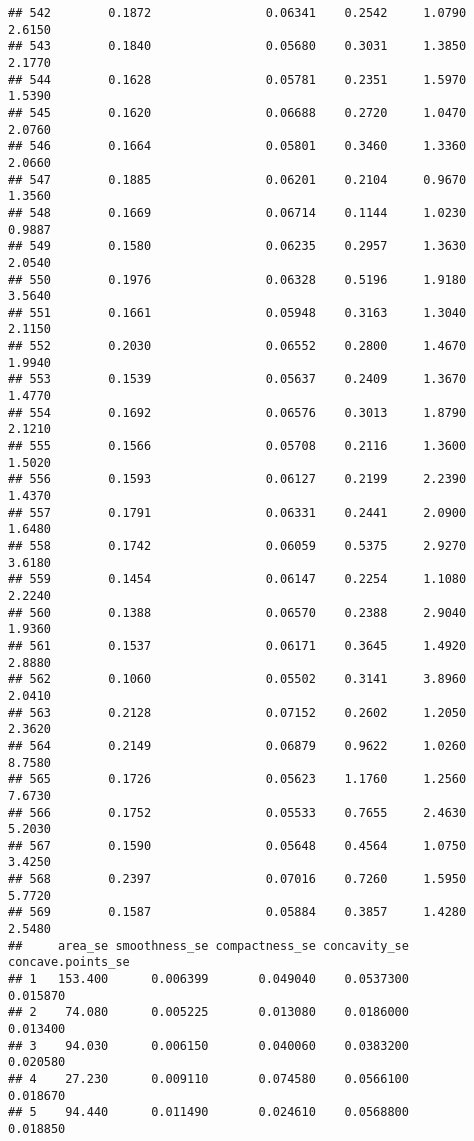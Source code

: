 \documentclass[
]{article}
\begin{document}
\begin{verbatim}
## 542        0.1872                0.06341    0.2542     1.0790       2.6150
## 543        0.1840                0.05680    0.3031     1.3850       2.1770
## 544        0.1628                0.05781    0.2351     1.5970       1.5390
## 545        0.1620                0.06688    0.2720     1.0470       2.0760
## 546        0.1664                0.05801    0.3460     1.3360       2.0660
## 547        0.1885                0.06201    0.2104     0.9670       1.3560
## 548        0.1669                0.06714    0.1144     1.0230       0.9887
## 549        0.1580                0.06235    0.2957     1.3630       2.0540
## 550        0.1976                0.06328    0.5196     1.9180       3.5640
## 551        0.1661                0.05948    0.3163     1.3040       2.1150
## 552        0.2030                0.06552    0.2800     1.4670       1.9940
## 553        0.1539                0.05637    0.2409     1.3670       1.4770
## 554        0.1692                0.06576    0.3013     1.8790       2.1210
## 555        0.1566                0.05708    0.2116     1.3600       1.5020
## 556        0.1593                0.06127    0.2199     2.2390       1.4370
## 557        0.1791                0.06331    0.2441     2.0900       1.6480
## 558        0.1742                0.06059    0.5375     2.9270       3.6180
## 559        0.1454                0.06147    0.2254     1.1080       2.2240
## 560        0.1388                0.06570    0.2388     2.9040       1.9360
## 561        0.1537                0.06171    0.3645     1.4920       2.8880
## 562        0.1060                0.05502    0.3141     3.8960       2.0410
## 563        0.2128                0.07152    0.2602     1.2050       2.3620
## 564        0.2149                0.06879    0.9622     1.0260       8.7580
## 565        0.1726                0.05623    1.1760     1.2560       7.6730
## 566        0.1752                0.05533    0.7655     2.4630       5.2030
## 567        0.1590                0.05648    0.4564     1.0750       3.4250
## 568        0.2397                0.07016    0.7260     1.5950       5.7720
## 569        0.1587                0.05884    0.3857     1.4280       2.5480
##     area_se smoothness_se compactness_se concavity_se concave.points_se
## 1   153.400      0.006399       0.049040    0.0537300          0.015870
## 2    74.080      0.005225       0.013080    0.0186000          0.013400
## 3    94.030      0.006150       0.040060    0.0383200          0.020580
## 4    27.230      0.009110       0.074580    0.0566100          0.018670
## 5    94.440      0.011490       0.024610    0.0568800          0.018850

\end{verbatim}
\end{document}
